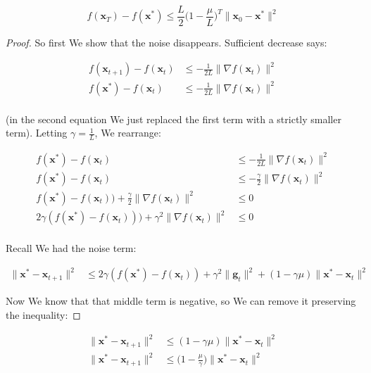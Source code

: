 \documentclass{article}
\begin{document}
		\[  f(\mathbf{x}_T) - f(\mathbf{x}^*) \le \frac{L}{2}\bigg(1-\frac{\mu}{L}\bigg)^T \|\mathbf{x}_0 - \mathbf{x}^*\|^2 \]
		
		\begin{proof}
			So first We show that the noise disappears. Sufficient decrease says:
			
			\begin{align*}
				f(\mathbf{x}_{t+1}) - f(\mathbf{x}_t) &\le -\frac{1}{2L} \|\nabla f(\mathbf{x}_t)\|^2\\
				f(\mathbf{x}^*) - f(\mathbf{x}_t) &\le -\frac{1}{2L} \|\nabla f(\mathbf{x}_t)\|^2\\
			\end{align*}
			
			(in the second equation We just replaced the first term with a strictly smaller term). Letting $\gamma = \frac{1}{L}$, We rearrange:
			
			\begin{align*}
				f(\mathbf{x}^*) - f(\mathbf{x}_t) &\le -\frac{1}{2L} \|\nabla f(\mathbf{x}_t)\|^2\\
				f(\mathbf{x}^*) - f(\mathbf{x}_t) &\le -\frac{\gamma}{2} \|\nabla f(\mathbf{x}_t)\|^2\\
				f(\mathbf{x}^*) - f(\mathbf{x}_t)) +\frac{\gamma}{2} \|\nabla f(\mathbf{x}_t)\|^2 &\le 0\\
				2\gamma(f(\mathbf{x}^*) - f(\mathbf{x}_t))) +\gamma^2 \|\nabla f(\mathbf{x}_t)\|^2 &\le 0\\
			\end{align*}
			
			Recall We had the noise term:
			
			\begin{align*}
				\| \mathbf{x}^* - \mathbf{x}_{t+1} \|^2&\le  2\gamma(f(\mathbf{x}^*) -f(\mathbf{x}_t))  + \gamma^2\|\mathbf{g}_t\|^2 + (1- \gamma\mu) \|\mathbf{x}^*-\mathbf{x}_t\|^2 
			\end{align*}
			
			Now We know that that middle term is negative, so We can remove it preserving the inequality:
			
		\end{proof}

			\begin{align*}
				\| \mathbf{x}^* - \mathbf{x}_{t+1} \|^2&\le   (1- \gamma\mu) \|\mathbf{x}^*-\mathbf{x}_t\|^2 \\
				\| \mathbf{x}^* - \mathbf{x}_{t+1} \|^2&\le   \bigg(1- \frac{\mu}{\gamma} \bigg) \|\mathbf{x}^*-\mathbf{x}_t\|^2 
			\end{align*}
			
\end{document}
